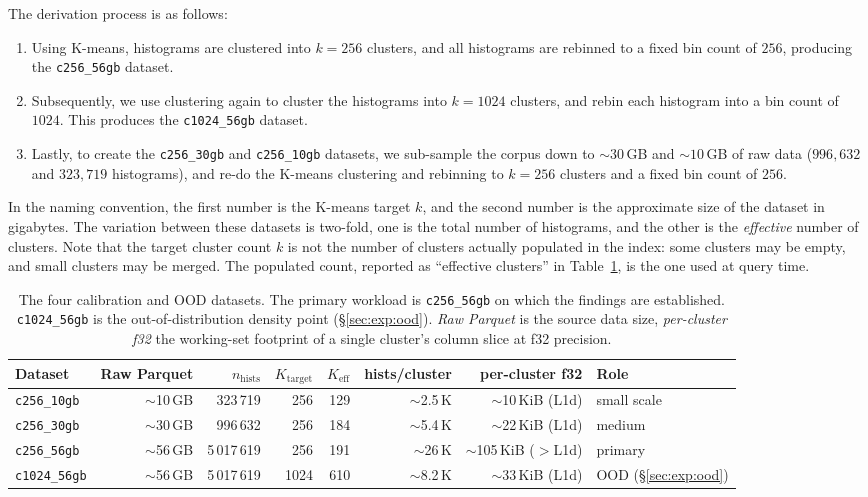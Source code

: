 The derivation process is as follows:
\begin{enumerate}
  \item Using K-means, histograms are clustered into $k = 256$ clusters, and all histograms are rebinned to a fixed bin count of $256$, producing the \texttt{c256\_56gb} dataset.
  \item Subsequently, we use clustering again to cluster the histograms into $k = 1024$ clusters, and rebin each histogram into a bin count of $1024$. This produces the \texttt{c1024\_56gb} dataset.
  \item Lastly, to create the \texttt{c256\_30gb} and \texttt{c256\_10gb} datasets, we sub-sample the corpus down to $\sim\!30$\,GB and $\sim\!10$\,GB of raw data ($996{,}632$ and $323{,}719$ histograms), and re-do the K-means clustering and rebinning to $k = 256$ clusters and a fixed bin count of $256$.
\end{enumerate}

In the naming convention, the first number is the K-means target $k$, and the second number is the approximate size of the dataset in gigabytes. The variation between these datasets is two-fold, one is the total number of histograms, and the other is the \emph{effective} number of clusters. Note that the target cluster count $k$ is not the number of clusters actually populated in the index: some clusters may be empty, and small clusters may be merged. The populated count, reported as ``effective clusters'' in Table~\ref{tab:method:datasets}, is the one used at query time.
 

\begin{table}[H]
\centering
\caption[The four evaluation datasets.]{The four calibration and OOD datasets. The primary workload is \texttt{c256\_56gb} on which the findings are established. \texttt{c1024\_56gb} is the out-of-distribution density point (§\ref{sec:exp:ood}). \emph{Raw Parquet} is the source data size, \emph{per-cluster f32} the working-set footprint of a single cluster's column slice at f32 precision.}
\label{tab:method:datasets}
\scriptsize
\setlength{\tabcolsep}{3pt}
\begin{tabular}{lrrrrrrl}
\toprule
Dataset & Raw Parquet & $n_{\text{hists}}$ & $K_{\text{target}}$ & $K_{\text{eff}}$ & hists/cluster & per-cluster f32 & Role \\
\midrule
\texttt{c256\_10gb}  & $\sim$10\,GB & 323\,719  & 256  & 129 & $\sim$2.5\,K & $\sim$10\,KiB (L1d)   & small scale  \\
\texttt{c256\_30gb}  & $\sim$30\,GB & 996\,632  & 256  & 184 & $\sim$5.4\,K & $\sim$22\,KiB (L1d)   & medium       \\
\texttt{c256\_56gb}  & $\sim$56\,GB & 5\,017\,619 & 256 & 191 & $\sim$26\,K  & $\sim$105\,KiB ($>$L1d) & primary      \\
\texttt{c1024\_56gb} & $\sim$56\,GB & 5\,017\,619 & 1024 & 610 & $\sim$8.2\,K & $\sim$33\,KiB (L1d)   & OOD (§\ref{sec:exp:ood}) \\
\bottomrule
\end{tabular}
\end{table}

